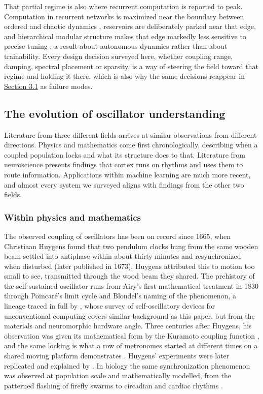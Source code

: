 \documentclass[a4paper,fleqn]{cas-sc}
\begin{document}
That partial regime is also where recurrent computation is reported to
peak. Computation in recurrent networks is maximized near the boundary
between ordered and chaotic dynamics \citep{bertschinger2004},
reservoirs are deliberately parked near that edge, and hierarchical
modular structure makes that edge markedly less sensitive to precise
tuning \citep{kusmierz2025}, a result about autonomous dynamics rather
than about trainability. Every design decision surveyed here, whether
coupling range, damping, spectral placement or sparsity, is a way of
steering the field toward that regime and holding it there, which is
also why the same decisions reappear in \hyperref[sec-3-1]{Section 3.1}
as failure modes.

\subsection{The evolution of oscillator understanding}\label{sec-1-2}

Literature from three different fields arrives at similar observations
from different directions. Physics and mathematics come first
chronologically, describing when a coupled population locks and what its
structure does to that. Literature from neuroscience presents findings
that cortex runs on rhythms and uses them to route information.
Applications within machine learning are much more recent, and almost
every system we surveyed aligns with findings from the other two fields.

\subsubsection{Within physics and mathematics}\label{sec-1-2-1}

The observed coupling of oscillators has been on record since 1665, when
Christiaan Huygens found that two pendulum clocks hung from the same
wooden beam settled into antiphase within about thirty minutes and
resynchronized when disturbed (later published in 1673). Huygens
attributed this to motion too small to see, transmitted through the wood
beam they shared. The prehistory of the self-sustained oscillator runs
from Airy's first mathematical treatment in 1830 through Poincaré's
limit cycle and Blondel's naming of the phenomenon, a lineage traced in
full by \citet{rivera-sierra2026}, whose survey of self-oscillatory
devices for unconventional computing covers similar background as this
paper, but from the materials and neuromorphic hardware angle. Three
centuries after Huygens, his observation was given its mathematical form
by the Kuramoto coupling function \citep{kuramoto1975}, and the same
locking is what a row of metronomes started at different times on a
shared moving platform demonstrates \citep{pantaleone2002}. Huygens'
experiments were later replicated and explained by \citet{bennett2002}.
In biology the same synchronization phenomenon was observed at
population scale and mathematically modelled, from the patterned
flashing of firefly swarms to circadian and cardiac rhythms
\citep{strogatz1993}.
\end{document}
